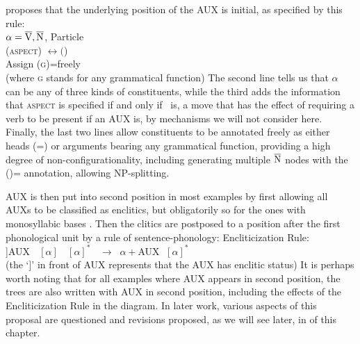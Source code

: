 \documentclass[output=paper,hidelinks]{langscibook}
\begin{document}
\citet[83]{Simpson1991} proposes that the underlying position of the AUX is initial,
as specified by this rule:
\newpage
\ea
{}\\
$\alpha=\overline{\hbox{V}}, \overline{\hbox{N}}$, Particle\\
(\UP\textsc{aspect}) $\leftrightarrow ($\UP\TENSE)~\\
Assign (\UP \textsc{g})=\DOWN freely~\\
(where \textsc{g} stands for any grammatical function)
\z
The second line tells us that $\alpha$ can be any of three kinds of constituents,
while the third adds the information that \textsc{aspect} is specified if and only
if \TENSE\ is, a move that has the effect of requiring a verb to be present
if an AUX is, by mechanisms we will not consider here.  Finally, the last two
lines allow constituents to be annotated
freely as either heads (\UP=\DOWN) or arguments bearing any grammatical
function, providing a high degree of non-configurationality, including generating
multiple $\overline{\hbox{N}}$ nodes with the {(\UP \SUBJ)=\DOWN} annotation, allowing
NP-splitting.

AUX is then put into second position in most examples by first allowing all
AUXs to be classified as enclitics, but obligatorily so for the ones with monosyllabic
bases \citep[69]{Simpson1991}.  Then the clitics are postposed to a position after
the first phonological unit by a rule of sentence-phonology:
\ea
Encliticization Rule:\\
]AUX $\;$ $[\alpha]$ $\;$ $[\alpha]^*$ $\;\;\rightarrow\;\; \alpha+$AUX $\;[\alpha]^*$\\
(the `]' in front of AUX represents that the AUX has enclitic status)
\z
It is perhaps worth noting that for all examples where AUX appears in second
position, the trees are also written with AUX in second position, including the
effects of the Encliticization Rule in the diagram.
In later work, various aspects of this proposal are questioned and revisions proposed,
as we will see later, in  of this chapter.
\end{document}
